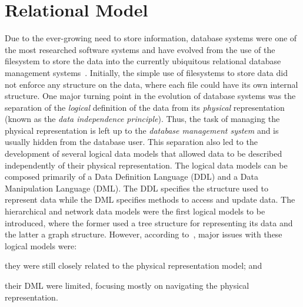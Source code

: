 

\section{Relational Model}
\label{sec:relational-model}

Due to the ever-growing need to store information, database systems were one of the most researched software systems and
have evolved from the use of the filesystem to store the data into the currently ubiquitous relational database
management systems~\cite{AbiteboulHullVianu:1995aa}.
%
Initially, the simple use of filesystems to store data did not enforce any structure on the data, where each file could
have its own internal structure. 
% 
One major turning point in the evolution of database systems was the separation of the \emph{logical} definition of the
data from its \emph{physical} representation (known as the \emph{data independence principle}).  Thus, the task of
managing the physical representation is left up to the \emph{database management system} and is usually hidden from the
database user.
%
This separation also led to the development of several logical data models that allowed data to be described
independently of their physical representation.
% 
The logical data models can be composed primarily of a Data Definition Language (DDL) and a Data Manipulation Language
(DML).  The DDL specifies the structure used to represent data while the DML specifies methods to access and update
data.
%
The hierarchical and network data models were the first logical models to be introduced, where the former used a tree
structure for representing its data and the latter a graph structure.
%
However, according to~\citet{AbiteboulHullVianu:1995aa}, major issues with these logical models were:
\begin{inparaenum}[(i)]
\item they were still closely related to the physical representation model; and
\item their DML were limited, focusing mostly on navigating the physical representation.
\end{inparaenum}

